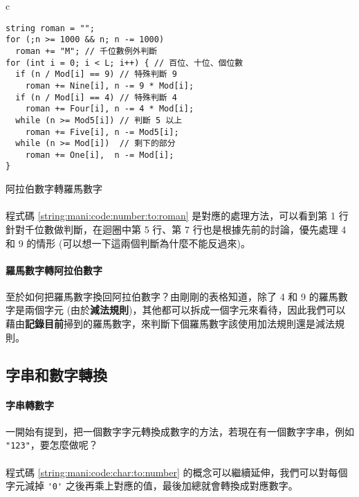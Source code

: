\documentclass[12pt,a4paper,oneside]{report}
\begin{document}
\begin{CJK}{UTF8}{bkai}
\begin{code}[h!]
  \centering
  \begin{tabular}{c}
  \begin{lstlisting}
string roman = "";
for (;n >= 1000 && n; n -= 1000)
  roman += "M"; // 千位數例外判斷
for (int i = 0; i < L; i++) { // 百位、十位、個位數
  if (n / Mod[i] == 9) // 特殊判斷 9
    roman += Nine[i], n -= 9 * Mod[i];
  if (n / Mod[i] == 4) // 特殊判斷 4
    roman += Four[i], n -= 4 * Mod[i];
  while (n >= Mod5[i]) // 判斷 5 以上
    roman += Five[i], n -= Mod5[i];
  while (n >= Mod[i])  // 剩下的部分
    roman += One[i],  n -= Mod[i];
}
  \end{lstlisting}
  \end{tabular}
  \caption{阿拉伯數字轉羅馬數字}
  \label{string:mani:code:number:to:roman}
\end{code}

\paragraph{}程式碼 \ref{string:mani:code:number:to:roman} 是對應的處理方法，可以看到第 1 行針對千位數做判斷，在迴圈中第 5 行、第 7 行也是根據先前的討論，優先處理 4 和 9 的情形 (可以想一下這兩個判斷為什麼不能反過來)。

\paragraph{羅馬數字轉阿拉伯數字}至於如何把羅馬數字換回阿拉伯數字？由剛剛的表格知道，除了 4 和 9 的羅馬數字是兩個字元 (由於\textbf{減法規則})，其他都可以拆成一個字元來看待，因此我們可以藉由{\color{red}\textbf{記錄目前}}掃到的羅馬數字，來判斷下個羅馬數字該使用加法規則還是減法規則。

\subsection{字串和數字轉換}

\paragraph{字串轉數字}一開始有提到，把一個數字字元轉換成數字的方法，若現在有一個數字字串，例如 \lstinline!"123"!，要怎麼做呢？

\paragraph{}程式碼 \ref{string:mani:code:char:to:number} 的概念可以繼續延伸，我們可以對每個字元減掉 \lstinline!'0'! 之後再乘上對應的值，最後加總就會轉換成對應數字。


\end{CJK}
\end{document}
